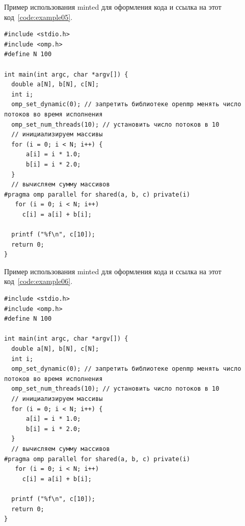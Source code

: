 Пример использования minted для оформления кода и ссылка на этот код~\ref{code:example05}.
\begin{code}
\vspace{-\baselineskip}\begin{verbatim}
#include <stdio.h>
#include <omp.h>
#define N 100

int main(int argc, char *argv[]) {
  double a[N], b[N], c[N];
  int i;
  omp_set_dynamic(0); // запретить библиотеке openmp менять число потоков во время исполнения
  omp_set_num_threads(10); // установить число потоков в 10
  // инициализируем массивы
  for (i = 0; i < N; i++) {
      a[i] = i * 1.0;
      b[i] = i * 2.0;
  }
  // вычисляем сумму массивов
#pragma omp parallel for shared(a, b, c) private(i)
   for (i = 0; i < N; i++)
     c[i] = a[i] + b[i];

  printf ("%f\n", c[10]);
  return 0;
}
\end{verbatim}
\end{code}

Пример использования minted для оформления кода и ссылка на этот код~\ref{code:example06}.
\begin{code}
\vspace{-\baselineskip}\begin{verbatim}
#include <stdio.h>
#include <omp.h>
#define N 100

int main(int argc, char *argv[]) {
  double a[N], b[N], c[N];
  int i;
  omp_set_dynamic(0); // запретить библиотеке openmp менять число потоков во время исполнения
  omp_set_num_threads(10); // установить число потоков в 10
  // инициализируем массивы
  for (i = 0; i < N; i++) {
      a[i] = i * 1.0;
      b[i] = i * 2.0;
  }
  // вычисляем сумму массивов
#pragma omp parallel for shared(a, b, c) private(i)
   for (i = 0; i < N; i++)
     c[i] = a[i] + b[i];

  printf ("%f\n", c[10]);
  return 0;
}
\end{verbatim}
\end{code}

